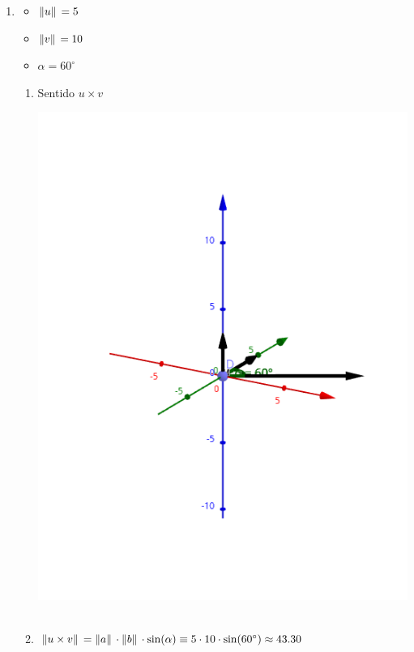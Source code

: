 \documentclass[../practica_01.tex]{subfiles}
\begin{document}
    \begin{enumerate}
        \item
            \begin{itemize}
                \item $\norm*{u} = 5$
                \item $\norm*{v} = 10$
                \item $\alpha = 60^\circ$
            \end{itemize}

            \begin{enumerate}
                \item Sentido $u \times v$

                    \includegraphics[scale=0.4]{ej11/resources/11a.png} $ $
                \item $\norm*{u \times v} = \norm*{a} \cdot \norm*{b} \cdot \sin(\alpha) \equiv 5 \cdot 10 \cdot \sin (60^\circ) \approx 43.30 $
            \end{enumerate}


\end{enumerate}
\end{document}
